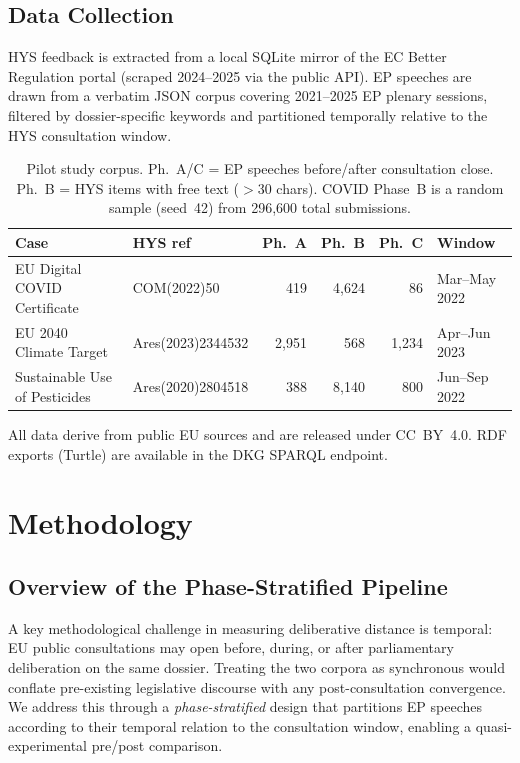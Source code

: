 \documentclass[sigconf,natbib]{acmart}
\begin{document}
\subsection{Data Collection}

HYS feedback is extracted from a local SQLite mirror of the EC Better Regulation portal
(scraped 2024--2025 via the public API). EP speeches are drawn from a verbatim JSON corpus
covering 2021--2025 EP plenary sessions, filtered by dossier-specific keywords and partitioned
temporally relative to the HYS consultation window.

\begin{table}[t]
\centering
\small
\begin{tabular}{llrrrl}
\toprule
\textbf{Case} & \textbf{HYS ref} & \textbf{Ph.~A} & \textbf{Ph.~B} & \textbf{Ph.~C} & \textbf{Window} \\
\midrule
EU Digital COVID Certificate  & COM(2022)50       & 419   & 4,624  & 86    & Mar--May 2022 \\
EU 2040 Climate Target        & Ares(2023)2344532 & 2,951 & 568    & 1,234 & Apr--Jun 2023 \\
Sustainable Use of Pesticides & Ares(2020)2804518 & 388   & 8,140  & 800   & Jun--Sep 2022 \\
\bottomrule
\end{tabular}
\caption{Pilot study corpus. Ph.~A/C = EP speeches before/after consultation close.
Ph.~B = HYS items with free text ($>$30 chars). COVID Phase~B is a random sample (seed~42)
from 296,600 total submissions.}
\label{tab:dataset}
\end{table}

\noindent
All data derive from public EU sources and are released under CC~BY~4.0.
RDF exports (Turtle) are available in the DKG SPARQL endpoint.

\section{Methodology}

\subsection{Overview of the Phase-Stratified Pipeline}

A key methodological challenge in measuring deliberative distance is temporal: EU public
consultations may open before, during, or after parliamentary deliberation on the same dossier.
Treating the two corpora as synchronous would conflate pre-existing legislative discourse with
any post-consultation convergence. We address this through a \textit{phase-stratified} design
that partitions EP speeches according to their temporal relation to the consultation window,
enabling a quasi-experimental pre/post comparison.
\end{document}
